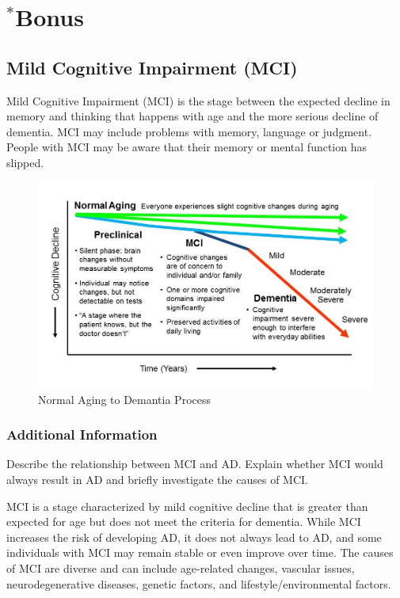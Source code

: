 \documentclass[12pt]{article}
\begin{document}
\section{$^*$Bonus}
\subsection{Mild Cognitive Impairment (MCI)}
\label{sec:5.1}
Mild Cognitive Impairment (MCI) is the stage between the expected decline in memory and thinking that happens with age and the more serious decline of dementia. MCI may include problems with memory, language or judgment. People with MCI may be aware that their memory or mental function has slipped. \cite{mayo-MCI}
\begin{figure}[h]
	\includegraphics[scale=0.5,width=1\textwidth, inner]{Normal-aging-to-dementia.jpg}
	\caption{Normal Aging to Demantia Process}
	\label{fig:figure2}
\end{figure}

\subsubsection{Additional Information}
Describe the relationship between MCI and AD. Explain whether MCI would always result in AD and briefly investigate the causes of MCI.

\begin{qsolve}[]
	MCI is a stage characterized by mild cognitive decline that is greater than expected for age but does not meet the criteria for dementia. While MCI increases the risk of developing AD, it does not always lead to AD, and some individuals with MCI may remain stable or even improve over time. The causes of MCI are diverse and can include age-related changes, vascular issues, neurodegenerative diseases, genetic factors, and lifestyle/environmental factors.
\end{qsolve}
\end{document}

